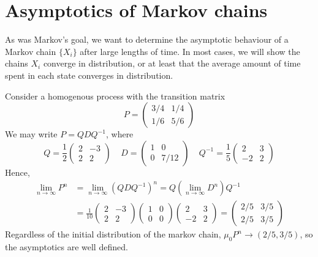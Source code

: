 \section{Asymptotics of Markov chains}

As was Markov's goal, we want to determine the asymptotic behaviour of a Markov chain $\{X_i\}$ after large lengths of time. In most cases, we will show the chains $X_i$ converge in distribution, or at least that the average amount of time spent in each state converges in distribution.

\begin{example}
    Consider a homogenous process with the transition matrix
    \[ P = \begin{pmatrix} 3/4 & 1/4 \\ 1/6 & 5/6 \end{pmatrix} \]
    We may write $P = QDQ^{-1}$, where
    \[ Q = \frac{1}{2} \begin{pmatrix} 2 & -3 \\ 2 & 2 \end{pmatrix} \ \ \ \ \ D = \begin{pmatrix} 1 & 0 \\ 0 & 7/12 \end{pmatrix} \ \ \ \ \ Q^{-1} = \frac{1}{5} \begin{pmatrix} 2 & 3 \\ -2 & 2 \end{pmatrix} \]
    Hence,
    \begin{align*}
        \lim_{n \to \infty} P^n &= \lim_{n \to \infty} (QDQ^{-1})^n = Q (\lim_{n \to \infty} D^n) Q^{-1}\\
        &= \frac{1}{10} \begin{pmatrix} 2 & -3 \\ 2 & 2 \end{pmatrix} \begin{pmatrix} 1 & 0 \\ 0 & 0 \end{pmatrix} \begin{pmatrix} 2 & 3 \\ -2 & 2 \end{pmatrix} = \begin{pmatrix} 2/5 & 3/5 \\ 2/5 & 3/5 \end{pmatrix}
    \end{align*}
    Regardless of the initial distribution of the markov chain, $\mu_0P^n \to (2/5, 3/5)$, so the asymptotics are well defined.
\end{example}


